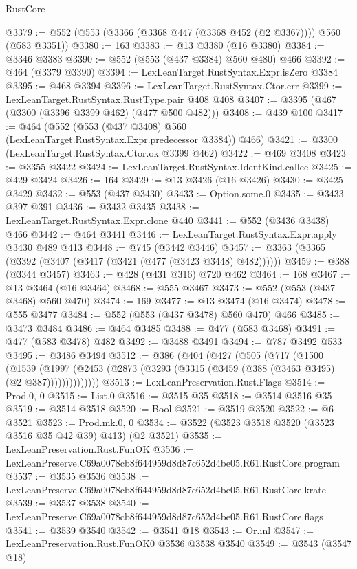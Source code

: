 \begin{lexlean}{RustCore}
\begin{coremodule}
@3379 := @552 (@553 (@3366 (@3368 @447 (@3368 @452 (@2 @3367)))) @560 (@583 @3351))
@3380 := 163
@3383 := @13 @3380 (@16 @3380)
@3384 := @3346 @3383
@3390 := @552 (@553 (@437 @3384) @560 @480) @466
@3392 := @464 (@3379 @3390)
@3394 := LexLeanTarget.RustSyntax.Expr.isZero @3384
@3395 := @468 @3394
@3396 := LexLeanTarget.RustSyntax.Ctor.err
@3399 := LexLeanTarget.RustSyntax.RustType.pair @408 @408
@3407 := @3395 (@467 (@3300 (@3396 @3399 @462) (@477 @500 @482)))
@3408 := @439 @100
@3417 := @464 (@552 (@553 (@437 @3408) @560 (LexLeanTarget.RustSyntax.Expr.predecessor @3384)) @466)
@3421 := @3300 (LexLeanTarget.RustSyntax.Ctor.ok @3399 @462)
@3422 := @469 @3408
@3423 := @3355 @3422
@3424 := LexLeanTarget.RustSyntax.IdentKind.callee
@3425 := @429 @3424
@3426 := 164
@3429 := @13 @3426 (@16 @3426)
@3430 := @3425 @3429
@3432 := @553 (@437 @3430)
@3433 := Option.some.{0}
@3435 := @3433 @397 @391
@3436 := @3432 @3435
@3438 := LexLeanTarget.RustSyntax.Expr.clone @440
@3441 := @552 (@3436 @3438) @466
@3442 := @464 @3441
@3446 := LexLeanTarget.RustSyntax.Expr.apply @3430 @489 @413
@3448 := @745 (@3442 @3446)
@3457 := @3363 (@3365 (@3392 (@3407 (@3417 (@3421 (@477 (@3423 @3448) @482))))))
@3459 := @388 (@3344 @3457)
@3463 := @428 (@431 @316) @720 @462
@3464 := 168
@3467 := @13 @3464 (@16 @3464)
@3468 := @555 @3467
@3473 := @552 (@553 (@437 @3468) @560 @470)
@3474 := 169
@3477 := @13 @3474 (@16 @3474)
@3478 := @555 @3477
@3484 := @552 (@553 (@437 @3478) @560 @470) @466
@3485 := @3473 @3484
@3486 := @464 @3485
@3488 := @477 (@583 @3468)
@3491 := @477 (@583 @3478) @482
@3492 := @3488 @3491
@3494 := @787 @3492 @533
@3495 := @3486 @3494
@3512 := @386
    (@404
      (@427
        (@505
          (@717
            (@1500
              (@1539
                (@1997 (@2453 (@2873 (@3293 (@3315 (@3459 (@388 (@3463 @3495) (@2 @387))))))))))))))
@3513 := LexLeanPreservation.Rust.Flags
@3514 := Prod.{0, 0}
@3515 := List.{0}
@3516 := @3515 @35
@3518 := @3514 @3516 @35
@3519 := @3514 @3518
@3520 := Bool
@3521 := @3519 @3520
@3522 := @6 @3521
@3523 := Prod.mk.{0, 0}
@3534 := @3522 (@3523 @3518 @3520 (@3523 @3516 @35 @42 @39) @413) (@2 @3521)
@3535 := LexLeanPreservation.Rust.FunOK
@3536 := LexLeanPreserve.C69a0078cb8f644959d8d87c652d4be05.R61.RustCore.program
@3537 := @3535 @3536
@3538 := LexLeanPreserve.C69a0078cb8f644959d8d87c652d4be05.R61.RustCore.krate
@3539 := @3537 @3538
@3540 := LexLeanPreserve.C69a0078cb8f644959d8d87c652d4be05.R61.RustCore.flags
@3541 := @3539 @3540
@3542 := @3541 @18
@3543 := Or.inl
@3547 := LexLeanPreservation.Rust.FunOK0 @3536 @3538 @3540
@3549 := @3543 (@3547 @18)

\end{coremodule}
\end{lexlean}
